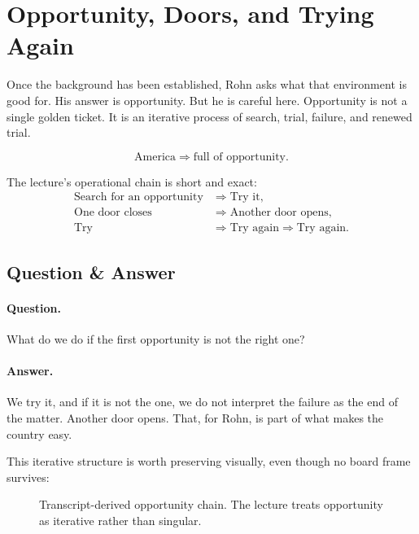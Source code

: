 \section{Opportunity, Doors, and Trying Again}

Once the background has been established, Rohn asks what that environment is good for. His answer is opportunity. But he is careful here. Opportunity is not a single golden ticket. It is an iterative process of search, trial, failure, and renewed trial.

\begin{equation}
\text{America} \Longrightarrow \text{full of opportunity}.
\end{equation}

The lecture's operational chain is short and exact:
\begin{align}
\text{Search for an opportunity} &\Longrightarrow \text{Try it},\\
\text{One door closes} &\Longrightarrow \text{Another door opens},\\
\text{Try} &\Longrightarrow \text{Try again} \Longrightarrow \text{Try again}.
\end{align}

\subsection{Question \& Answer}

\paragraph{Question.} What do we do if the first opportunity is not the right one?

\paragraph{Answer.} We try it, and if it is not the one, we do not interpret the failure as the end of the matter. Another door opens. That, for Rohn, is part of what makes the country easy.

This iterative structure is worth preserving visually, even though no board frame survives:

\begin{figure}[h]
\centering
{}
\caption{Transcript-derived opportunity chain. The lecture treats opportunity as iterative rather than singular.}
\end{figure}

